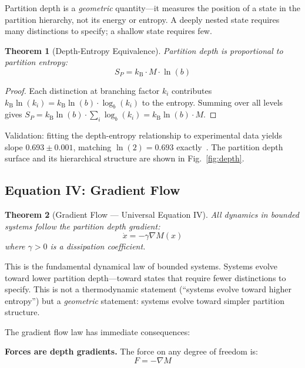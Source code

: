 \documentclass[aps,prx,superscriptaddress,twocolumn,10pt,a4paper,longbibliography,preprint]{revtex4-2}
\newcommand{\kB}{k_{\mathrm{B}}}
\newtheorem{theorem}{Theorem}[section]
\theoremstyle{definition}
\theoremstyle{remark}
\begin{document}
Partition depth is a \emph{geometric} quantity---it measures the position of a state in the partition hierarchy, not its energy or entropy. A deeply nested state requires many distinctions to specify; a shallow state requires few.

\begin{theorem}[Depth-Entropy Equivalence]
\label{thm:depth_entropy}
Partition depth is proportional to partition entropy:
\begin{equation}
S_P = \kB \cdot M \cdot \ln(b)
\label{eq:depth_entropy}
\end{equation}
\end{theorem}

\begin{proof}
Each distinction at branching factor $k_i$ contributes $\kB \ln(k_i) = \kB \ln(b) \cdot \log_b(k_i)$ to the entropy. Summing over all levels gives $S_P = \kB \ln(b) \cdot \sum_i \log_b(k_i) = \kB \ln(b) \cdot M$.
\end{proof}

Validation: fitting the depth-entropy relationship to experimental data yields slope $0.693 \pm 0.001$, matching $\ln(2) = 0.693$ exactly~\cite{Sachikonye2026c}. The partition depth surface and its hierarchical structure are shown in Fig.~\ref{fig:depth}.

\subsection{Equation IV: Gradient Flow}

\begin{theorem}[Gradient Flow --- Universal Equation IV]
\label{thm:gradient}
All dynamics in bounded systems follow the partition depth gradient:
\begin{equation}
\boxed{\dot{x} = -\gamma \nabla M(x)}
\label{eq:gradient}
\end{equation}
where $\gamma > 0$ is a dissipation coefficient.
\end{theorem}

This is the fundamental dynamical law of bounded systems. Systems evolve toward lower partition depth---toward states that require fewer distinctions to specify. This is not a thermodynamic statement (``systems evolve toward higher entropy'') but a \emph{geometric} statement: systems evolve toward simpler partition structure.

The gradient flow law has immediate consequences:

\textbf{Forces are depth gradients.} The force on any degree of freedom is:
\begin{equation}
F = -\nabla M
\label{eq:force}
\end{equation}
\end{document}
